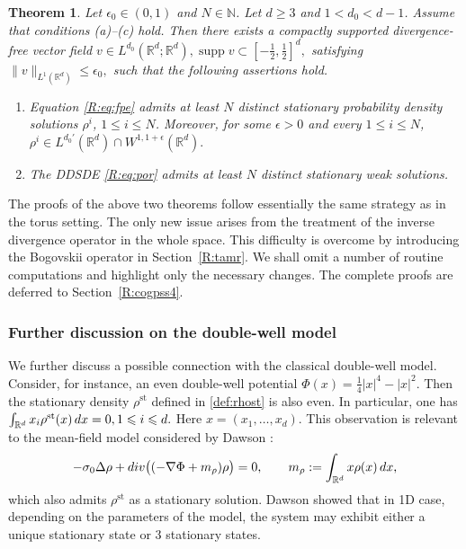 \documentclass[10pt,a4paper]{amsart}
\numberwithin{equation}{section}
\newtheorem{theorem}{Theorem}[section]
\def\dif{{\mathord{{\rm d}}}}
\def\geq{\geqslant}
\def\leq{\leqslant}
\def\div{\mathord{{\rm div}}}
\def\dif{{\mathord{{\rm d}}}}
\def\geq{\geqslant}
\def\leq{\leqslant}
\def\div{\mathord{{\rm div}}}
\begin{document}
\begin{theorem}\label{R:thm:sta}
Let $\epsilon_0\in(0,1)$ and $N\in\mathbb{N}$. Let $d\geq 3$ and
$1<d_0<d-1$. Assume that conditions \textnormal{(a)}--\textnormal{(c)} hold. Then there exists a
compactly supported divergence-free vector field
$
v\in L^{d_0}(\mathbb{R}^d;\mathbb{R}^d),
\operatorname{supp}v
\subset
 [-\frac12,\frac12 ]^d,
$
satisfying $
\|v\|_{L^1(\mathbb{R}^d)}
\leq
\epsilon_0 ,$
such that the following assertions hold.

\begin{enumerate}
\item
Equation \eqref{R:eq:fpe} 
admits at least $N$ distinct stationary probability density solutions $\rho^i$,
$1\leq i\leq N$. Moreover, for some $\epsilon>0$ and every $1\leq i\leq N$,
$
\rho^i
\in
L^{d_0'}(\mathbb{R}^d)
\cap
W^{1,1+\epsilon}(\mathbb{R}^d).
$

\item
The DDSDE \eqref{R:eq:por} admits at least $N$ distinct stationary  weak
solutions. 
\end{enumerate}
\end{theorem}
 


The proofs of the above two theorems follow essentially the same strategy as
in the torus setting. The only new issue arises from the treatment of the
inverse divergence operator in the whole space. This difficulty is overcome by
introducing the Bogovskii operator in Section~\ref{R:tamr}. We shall omit a number of routine
computations and highlight only the necessary changes. The complete proofs are
deferred to Section~\ref{R:cogpss4}.
 
\subsubsection{Further discussion on the double-well model} 

We further discuss a possible connection with the classical double-well model. Consider, for instance, an even double-well potential
$
\Phi(x)=\frac14 |x|^4- |x|^2 .
$
Then the stationary density $\rho^{\mathrm{st}}$ defined in
\eqref{def:rhost} is also even. In particular,   one has
$
\int_{\mathbb{R}^d} x_i \rho^{\mathrm{st}}(x)\,\dif x=0,
1\leq i\leq d .
$
Here $x=(x_1,\ldots,x_d)$.
This observation is relevant to the mean-field model considered by Dawson
\cite{Daw83}:
\begin{align}
-\sigma_0\Delta\rho
+\div\bigl((-\nabla\Phi+m_\rho)\rho\bigr)
=
0,
\qquad
m_\rho:=\int_{\mathbb{R}^d}x\rho(x)\,\dif x ,\notag
\end{align}which also admits
$\rho^{\mathrm{st}}$ as a stationary solution. Dawson \cite{Daw83} showed that in 1D case, depending on the
parameters of the model, the system may exhibit either a unique stationary
state or 3 stationary states.  
\end{document}
